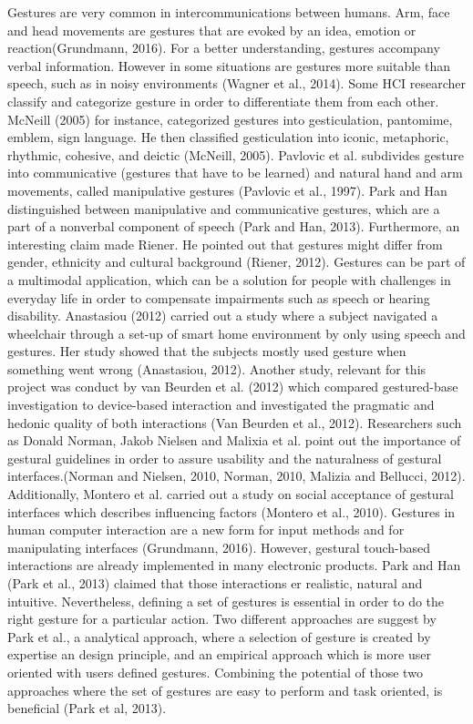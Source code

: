 Gestures are very common in intercommunications between humans. Arm, face and head movements are gestures that are evoked by an idea, emotion or reaction(Grundmann, 2016). For a better understanding, gestures accompany verbal information. However in some situations are gestures more suitable than speech, such as in noisy environments (Wagner et al., 2014).
Some HCI researcher classify and categorize gesture in order to differentiate them from each other. McNeill (2005) for instance, categorized gestures into gesticulation, pantomime, emblem, sign language. He then classified gesticulation into iconic, metaphoric, rhythmic, cohesive, and deictic (McNeill, 2005). Pavlovic et al. subdivides gesture into communicative (gestures that have to be learned) and natural hand and arm movements, called manipulative gestures (Pavlovic et al., 1997). Park and Han distinguished between manipulative and communicative gestures, which are a part of a nonverbal component of speech (Park and Han, 2013). Furthermore, an interesting claim made Riener. He pointed out that gestures might differ from gender, ethnicity and cultural background (Riener, 2012). 
\newline 
Gestures can be part of a multimodal application, which can be a solution for people with challenges in everyday life in order to compensate impairments such as speech or hearing disability. Anastasiou (2012) carried out a study where a subject navigated a wheelchair through a set-up of smart home environment by only using speech and gestures. Her study showed that the subjects mostly used gesture when something went wrong (Anastasiou, 2012). Another study, relevant for this project was conduct by van Beurden et al. (2012) which compared gestured-base investigation to device-based interaction  and investigated the pragmatic and hedonic quality of both interactions (Van Beurden et al., 2012). Researchers such as Donald Norman, Jakob Nielsen and Malixia et al. point out the importance of gestural guidelines in order to assure usability and the naturalness of gestural interfaces.(Norman and Nielsen, 2010, Norman, 2010, Malizia and Bellucci, 2012). Additionally, Montero et al. carried out a study on social acceptance of gestural interfaces which describes influencing factors (Montero et al., 2010).
\newline
Gestures in human computer interaction are a new form for input methods and for manipulating interfaces (Grundmann, 2016). However, gestural touch-based interactions are already implemented in many electronic products. Park and Han (Park et al., 2013) claimed that those interactions er realistic, natural and intuitive. Nevertheless, defining a set of gestures is essential in order to do the right gesture for a particular action. Two different approaches are suggest by Park et al., a analytical approach, where a selection of gesture is created by expertise an design principle, and an empirical approach which is more user oriented with users defined gestures. Combining the potential of those two approaches where the set of gestures are easy to perform and task oriented, is beneficial (Park et al, 2013). 
